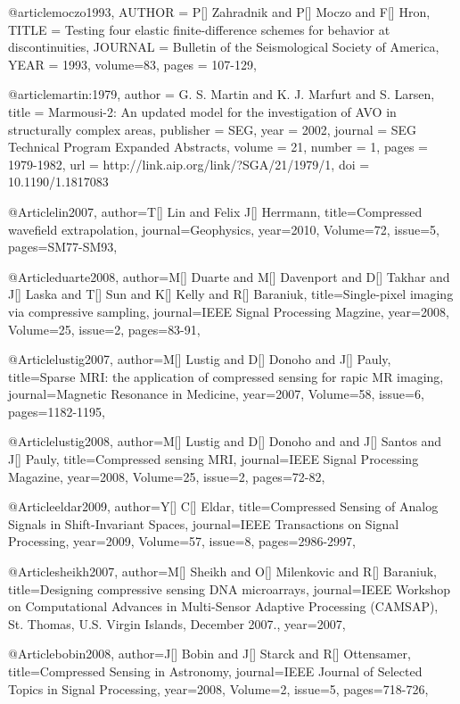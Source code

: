 @article{moczo1993,
  AUTHOR =       {P[] Zahradnik and P[] Moczo and F[] Hron},
  TITLE =        {Testing four elastic finite-difference schemes for behavior at discontinuities},
  JOURNAL =      {Bulletin of the Seismological Society of America},
  YEAR =         {1993},
  volume=83,
  pages = {107-129},
}

@article{martin:1979,
  author =	 {G. S. Martin and K. J. Marfurt and S. Larsen},
  title =	 {Marmousi-2: An updated model for the investigation
                  of AVO in structurally complex areas},
  publisher =	 {SEG},
  year =	 2002,
  journal =	 {SEG Technical Program Expanded Abstracts},
  volume =	 21,
  number =	 1,
  pages =	 {1979-1982},
  url =		 {http://link.aip.org/link/?SGA/21/1979/1},
  doi =		 {10.1190/1.1817083}
}

@Article{lin2007,
  author={T[] Lin and Felix J[] Herrmann},
  title={Compressed wavefield extrapolation},
  journal={Geophysics},
  year=2010,
  Volume=72,
  issue=5,
  pages={SM77-SM93},
}

@Article{duarte2008,
  author={M[] Duarte and M[] Davenport and D[] Takhar and J[] Laska and T[] Sun and K[] Kelly and R[] Baraniuk},
  title={Single-pixel imaging via compressive sampling},
  journal={IEEE Signal Processing Magzine},
  year=2008,
  Volume=25,
  issue=2,
  pages={83-91},
}

@Article{lustig2007,
  author={M[] Lustig and D[] Donoho and J[] Pauly},
  title={Sparse MRI: the application of compressed sensing for rapic MR imaging},
  journal={Magnetic Resonance in Medicine},
  year=2007,
  Volume=58,
  issue=6,
  pages={1182-1195},
}

@Article{lustig2008,
  author={M[] Lustig and D[] Donoho and and J[] Santos and J[] Pauly},
  title={Compressed sensing MRI},
  journal={IEEE Signal Processing Magazine},
  year=2008,
  Volume=25,
  issue=2,
  pages={72-82},
}

@Article{eldar2009,
  author={Y[] C[] Eldar},
  title={Compressed Sensing of Analog Signals in Shift-Invariant Spaces},
  journal={IEEE Transactions on Signal Processing},
  year=2009,
  Volume=57,
  issue=8,
  pages={2986-2997},
}

@Article{sheikh2007,
  author={M[] Sheikh and O[] Milenkovic and R[] Baraniuk},
  title={Designing compressive sensing DNA microarrays},
  journal={IEEE Workshop on Computational Advances in Multi-Sensor Adaptive
Processing (CAMSAP), St. Thomas, U.S. Virgin Islands, December 2007.},
  year=2007,
}

@Article{bobin2008,
  author={J[] Bobin and J[] Starck and R[] Ottensamer},
  title={Compressed Sensing in Astronomy},
  journal={IEEE Journal of Selected Topics in Signal Processing},
  year=2008,
  Volume=2,
  issue=5,
  pages={718-726},
}

